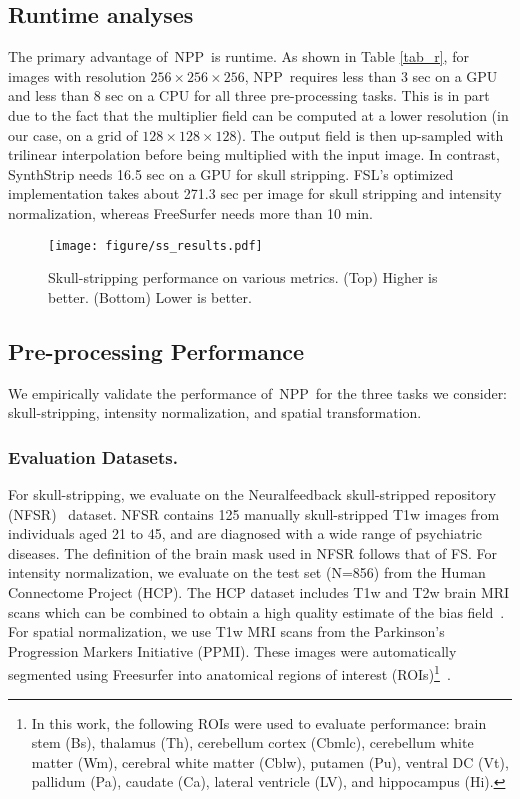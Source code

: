 \documentclass[runningheads]{llncs}
\newcommand{\modelname}{NPP}
\begin{document}
\subsection{Runtime analyses}

The primary advantage of~\modelname~is runtime. 
As shown in Table \ref{tab_r}, for images with resolution $256 \times 256 \times 256$, \modelname~requires less than 3 sec on a GPU and less than 8 sec on a CPU for all three pre-processing tasks. 
This is in part due to the fact that the multiplier field can be computed at a lower resolution (in our case, on a grid of $128 \times 128 \times 128$). 
The output field is then up-sampled with trilinear interpolation before being multiplied with the input image. 
In contrast, SynthStrip needs 16.5 sec on a GPU for skull stripping. 
FSL's optimized implementation takes about 271.3 sec per image for skull stripping and intensity normalization, whereas FreeSurfer needs more than 10 min.

\begin{figure}[t]
\centering
\texttt{[image: figure/ss\_results.pdf]}
\caption{Skull-stripping performance on various metrics. (Top) Higher is better. (Bottom) Lower is better.} \label{fig_sr} 
\end{figure}
\subsection{Pre-processing Performance}
We empirically validate the performance of~\modelname~for the three tasks we consider: skull-stripping, intensity normalization, and spatial transformation. 

\subsubsection{Evaluation Datasets.}
For skull-stripping, we evaluate on the Neuralfeedback skull-stripped repository (NFSR)~\cite{Eskildsen2012} dataset. 
NFSR contains 125 manually skull-stripped T1w images from individuals aged 21 to 45, and are diagnosed with a wide range of psychiatric diseases. The definition of the brain mask used in NFSR follows that of FS.  
For intensity normalization, we evaluate on the test set (N=856) from the Human Connectome Project (HCP). 
The HCP dataset includes T1w and T2w brain MRI scans which can be combined to obtain a high quality estimate of the bias field~\cite{Song2022,Glasser2013}.
For spatial normalization, we use T1w MRI scans from the Parkinson's Progression Markers Initiative (PPMI). These images were automatically segmented using Freesurfer into anatomical regions of interest (ROIs)\footnote{
In this work, the following ROIs were used to evaluate performance: brain stem (Bs), thalamus (Th), cerebellum cortex (Cbmlc), cerebellum white matter (Wm), cerebral white matter (Cblw), putamen (Pu), ventral DC (Vt), pallidum (Pa), caudate (Ca), lateral ventricle (LV), and hippocampus (Hi).}~\cite{dalca2018anatomical}.
\end{document}
